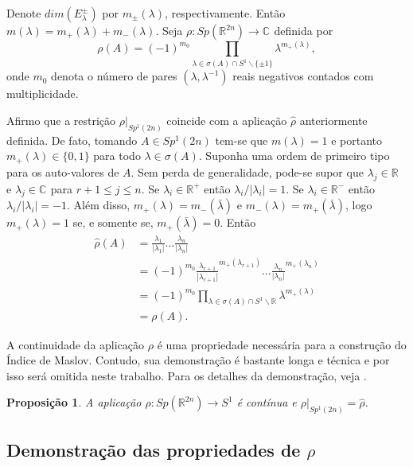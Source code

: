 \documentclass[12pt]{book}
\newtheorem{proposicao}[teorema]{Proposição}
\newcommand{\autoespaco}[1]{E_{#1}}
\newcommand{\circulo}{S^{1}}
\newcommand{\complementar}[2]{#1 \backslash #2}
\newcommand{\complexo}[1]{\mathbb{C}^{#1}}
\newcommand{\espectrooperador}[1]{\sigma(#1)}
\newcommand{\gruposimpletico}[1]{Sp(#1)}
\newcommand{\gruposimpleticoespecial}[1]{Sp^{1}(#1)}
\newcommand{\real}[1]{\mathbb{R}^{#1}}
\newcommand{\reta}{\real{}}
\begin{document}
	Denote $dim(\autoespaco{\lambda}^{\pm})$ por $m_{\pm}(\lambda)$, respectivamente. Então $m(\lambda)=m_{+}(\lambda)+m_{-}(\lambda)$. Seja $\rho: \gruposimpletico{\real{2n}}\to \complexo{}$ definida por
	$$
	\rho(A) = 	(-1)^{m_{0}} \prod_{\lambda \in \sigma(A)\cap \complementar{\circulo}{\{\pm 1 \}  }}\lambda^{m_{+}(\lambda)},
	$$
	onde $m_{0}$ denota o número de pares $(\lambda, \lambda^{-1})$ reais negativos contados com multiplicidade.

	Afirmo que a restrição $\rho|_{\gruposimpleticoespecial{2n}}$ coincide com a aplicação $\hat{\rho}$ anteriormente definida. De fato, tomando $A \in \gruposimpleticoespecial{2n}$ tem-se que $m(\lambda)=1$ e portanto $m_{+}(\lambda) \in \{0,1\}$ para todo $\lambda\in \espectrooperador{A}$. Suponha uma ordem de primeiro tipo para os auto-valores de $A$. Sem perda de generalidade, pode-se supor que $\lambda_{j} \in \reta$ e $\lambda_{j}\in \complexo{}$ para $r+1 \leq  j\leq n$. Se $\lambda_i\in \real{+}$ então $\lambda_i/|\lambda_i|=1$. Se $\lambda_i\in \real{-}$ então $\lambda_i/|\lambda_i|=-1$. Além disso, $m_{+}(\lambda)=m_{-}(\bar{\lambda})$ e $m_{-}(\lambda)=m_{+}(\bar{\lambda})$, logo $m_{+}(\lambda)=1$ se, e somente se, $m_{+}(\bar{\lambda})=0$. Então  
	$$
	\begin{aligned}
	\hat{\rho}(A) 
	&=
	\frac{\lambda_{1}}{|\lambda_{1}|}\dots \frac{\lambda_{n}}{|\lambda_{n}|}
	\\
	&= (-1)^{m_{0}}\frac{\lambda_{r+1}}{|\lambda_{r+1}|}^{m_{+}(\lambda_{r+1})} \dots \frac{\lambda_{n}}{|\lambda_{n}|}^{m_{+}(\lambda_{n})}
	\\
	&=(-1)^{m_{0}}\prod_{\lambda\in \espectrooperador{A}\cap\complementar{\circulo}{\reta}}\lambda^{m_{+}(\lambda)}
	\\
	&= \rho(A).
	\end{aligned}
	$$

	A continuidade da aplicação $\rho$ é uma propriedade necessária para a construção do Índice de Maslov. Contudo, sua demonstração é bastante longa e técnica e por isso será omitida neste trabalho. Para os detalhes da demonstração, veja \cite{audi_floer_homology}.
	
	
	\begin{proposicao}\label{proposicao_continuidade_rho}
		A aplicação $\rho: \gruposimpletico{\real{2n}}\to \circulo$ é contínua e $\rho|_{\gruposimpleticoespecial{2n}} = \hat{\rho}$.
	\end{proposicao}
	
	\subsection*{Demonstração das propriedades de $\rho$}
	
\end{document}
